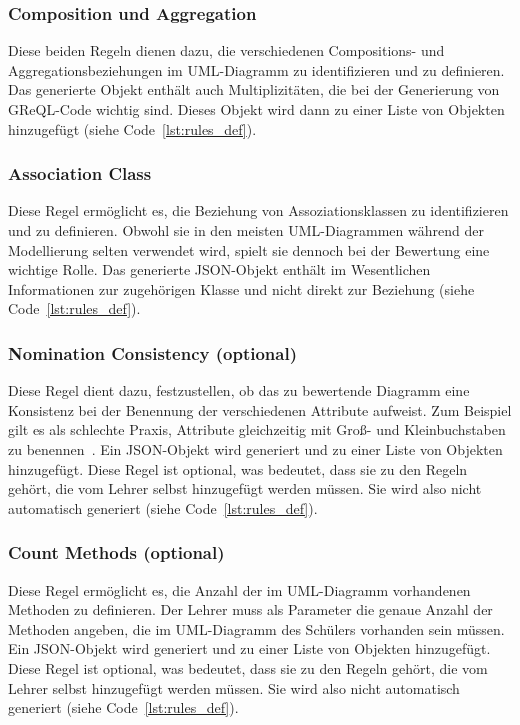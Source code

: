 \subsubsection{Composition und Aggregation}
Diese beiden Regeln dienen dazu, die verschiedenen Compositions- und Aggregationsbeziehungen im UML-Diagramm zu
identifizieren und zu definieren. Das generierte Objekt enthält auch Multiplizitäten, die bei der Generierung von
GReQL-Code wichtig sind. Dieses Objekt wird dann zu einer Liste von Objekten hinzugefügt (siehe Code~\ref{lst:rules_def}).

\subsubsection{Association Class}
Diese Regel ermöglicht es, die Beziehung von Assoziationsklassen zu identifizieren und zu definieren. Obwohl sie in den
meisten UML-Diagrammen während der Modellierung selten verwendet wird, spielt sie dennoch bei der Bewertung eine
wichtige Rolle. Das generierte JSON-Objekt enthält im Wesentlichen Informationen zur zugehörigen Klasse und nicht direkt
zur Beziehung (siehe Code~\ref{lst:rules_def}).

\subsubsection{Nomination Consistency (optional)}
Diese Regel dient dazu, festzustellen, ob das zu bewertende Diagramm eine Konsistenz bei der Benennung der verschiedenen
Attribute aufweist. Zum Beispiel gilt es als schlechte Praxis, Attribute gleichzeitig mit Groß- und Kleinbuchstaben zu
benennen~\cite{albert2003implementing}. Ein JSON-Objekt wird generiert und zu einer Liste von Objekten hinzugefügt.
Diese Regel ist optional, was bedeutet, dass sie zu den Regeln gehört, die vom Lehrer selbst hinzugefügt werden müssen.
Sie wird also nicht automatisch generiert (siehe Code~\ref{lst:rules_def}).

\subsubsection{Count Methods (optional)}
Diese Regel ermöglicht es, die Anzahl der im UML-Diagramm vorhandenen Methoden zu definieren. Der Lehrer muss als
Parameter die genaue Anzahl der Methoden angeben, die im UML-Diagramm des Schülers vorhanden sein müssen.
Ein JSON-Objekt wird generiert und zu einer Liste von Objekten hinzugefügt. Diese Regel ist optional, was bedeutet,
dass sie zu den Regeln gehört, die vom Lehrer selbst hinzugefügt werden müssen. Sie wird also nicht automatisch
generiert (siehe Code~\ref{lst:rules_def}).

